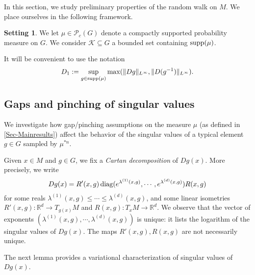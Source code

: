 \documentclass[11pt, leqno, fleqn]{amsart}
\newcommand{\margem}[1]{\marginpar{{\scriptsize {#1}}}}
\def\maxder{  D_1 }
\def\clo{   \color{orange}}
\def\clb{   \color{black}}
\newcommand{\SectionSymbol}{\textsection}
\def \R{{\mathbb R}}
\newcommand{\cP}{{\mathcal P}}
\newcommand{\cK}{{\mathcal K}}
\newcommand{\ary}{\begin{eqnarray}}
\newcommand{\eary}{\end{eqnarray}}
\theoremstyle{definition}
\newtheorem{setting}[thm]{\bf Setting}
\theoremstyle{definition}
\def\supp{{\rm supp}}
\newcommand{\diag}{\mathop{\rm diag}}
\begin{document}
	In this section, we study preliminary properties of  the random walk on $M$. We place ourselves in the following framework.
	
	\begin{setting}\label{Setting-Dimpos}
	We let $\mu\in  \cP_{c}(G)$ denote a compactly supported probability measure on $G$. We consider $\cK\subseteq G$ a bounded set containing $\supp( \mu)$. 
	\end{setting}
	It will be convenient to use the notation
    \ary  \label{eq D1}
      \maxder := \sup_{g \in \supp(\mu)} \max( \| Dg \|_{L^{\infty}}, \| D(g^{-1}) \|_{L^{\infty}} ).
    \eary
 

 
  
	
	\subsection{Gaps and pinching of singular values} \label{sec-gap-pinch}
	We investigate how  gap/pinching assumptions on the measure $\mu$ (as defined in \SectionSymbol \ref{Sec-Mainresults}) affect the behavior of the singular values of a typical element $g\in G$ sampled by $\mu^{*n}$. 
	
	
	\bigskip
			Given $x \in M$ and $g \in G$, we fix a \emph{Cartan decomposition} of  $Dg(x)$. More precisely, we write
	\begin{align*}
	Dg(x) = R'(x, g)   \diag(e^{\lambda^{(1)}(x, g)}, \cdots, e^{\lambda^{(d)}(x, g)} )  R(x, g) 
	\end{align*}
	for some reals $\lambda^{(1)}(x, g)  \leq \cdots \leq   \lambda^{(d)}(x, g)$, and some linear isometries $R'(x, g):  \R^d \to T_{g(x)}M$ and $R(x, g) :  T_x M \to \R^d$. We observe that the vector of exponents $(\lambda^{(1)}(x, g), \cdots, \lambda^{(d)}(x, g) )$ is unique:  it lists the logarithm of the singular values of $Dg(x)$. The maps $R'(x, g), R(x, g)$ are not necessarily unique.  
	

	
	
	
	
	The next lemma provides a variational characterization of singular values of $D g(x)$.
	
	
	
\end{document}
